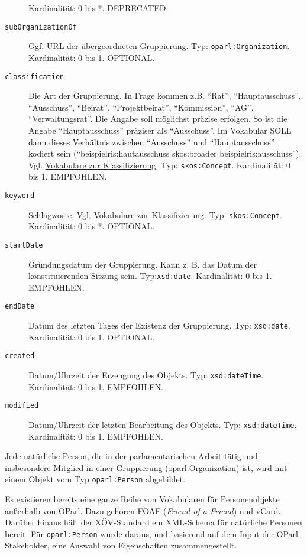 \documentclass[,a4paper]{article}
\begin{document}
\begin{description}
Kardinalität: 0 bis *. DEPRECATED.
\item[\texttt{subOrganizationOf}]
Ggf. URL der übergeordneten Gruppierung. Typ:
\texttt{oparl:Organization}. Kardinalität: 0 bis 1. OPTIONAL.
\item[\texttt{classification}]
Die Art der Gruppierung. In Frage kommen z.B. ``Rat'',
``Hauptausschuss'', ``Ausschuss'', ``Beirat'', ``Projektbeirat'',
``Kommission'', ``AG'', ``Verwaltungsrat''. Die Angabe soll möglichst
präzise erfolgen. So ist die Angabe ``Hauptausschuss'' präziser als
``Ausschuss''. Im Vokabular SOLL dann dieses Verhältnis zwischen
``Ausschuss'' und ``Hauptausschuss'' kodiert sein
(``beispielris:hautausschuss skos:broader beispielris:ausschuss''). Vgl.
\hyperref[vokabulareux5fklassifizierung]{Vokabulare zur
Klassifizierung}. Typ: \texttt{skos:Concept}. Kardinalität: 0 bis 1.
EMPFOHLEN.
\item[\texttt{keyword}]
Schlagworte. Vgl. \hyperref[vokabulareux5fklassifizierung]{Vokabulare
zur Klassifizierung}. Typ: \texttt{skos:Concept}. Kardinalität: 0 bis *.
OPTIONAL.
\item[\texttt{startDate}]
Gründungsdatum der Gruppierung. Kann z. B. das Datum der
konstituierenden Sitzung sein. Typ:\texttt{xsd:date}. Kardinalität: 0
bis 1. EMPFOHLEN.
\item[\texttt{endDate}]
Datum des letzten Tages der Existenz der Gruppierung. Typ:
\texttt{xsd:date}. Kardinalität: 0 bis 1. OPTIONAL.
\item[\texttt{created}]
Datum/Uhrzeit der Erzeugung des Objekts. Typ: \texttt{xsd:dateTime}.
Kardinalität: 0 bis 1. EMPFOHLEN.
\item[\texttt{modified}]
Datum/Uhrzeit der letzten Bearbeitung des Objekts. Typ:
\texttt{xsd:dateTime}. Kardinalität: 0 bis 1. EMPFOHLEN.
\end{description}


Jede natürliche Person, die in der parlamentarischen Arbeit tätig und
insbesondere Mitglied in einer Gruppierung
(\hyperref[oparlux5forganization]{oparl:Organization}) ist, wird mit
einem Objekt vom Typ \texttt{oparl:Person} abgebildet.

Es existieren bereits eine ganze Reihe von Vokabularen für
Personenobjekte außerhalb von OParl. Dazu gehören FOAF (\emph{Friend of
a Friend}) und vCard. Darüber hinaus hält der XÖV-Standard ein
XML-Schema für natürliche Personen bereit. Für \texttt{oparl:Person}
wurde daraus, und basierend auf dem Input der OParl-Stakeholder, eine
Auswahl von Eigenschaften zusammengestellt.
\end{document}
